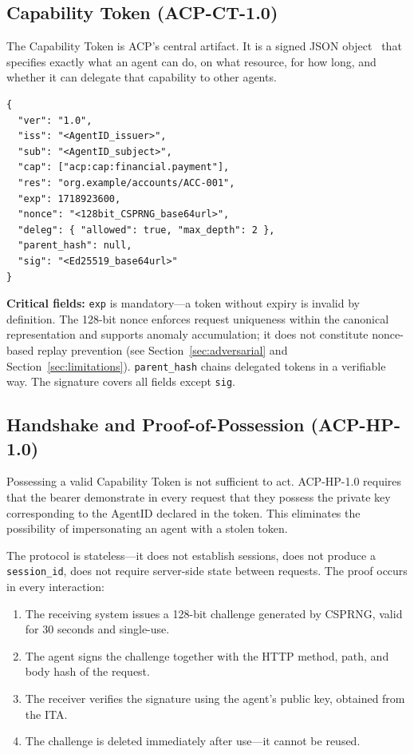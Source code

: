 \documentclass[11pt]{article}
\theoremstyle{definition}
\begin{document}
\subsection{Capability Token (ACP-CT-1.0)}

The Capability Token is ACP's central artifact.
It is a signed JSON object~\cite{rfc7519} that specifies exactly what an agent can do, on what resource, for how long, and whether it can delegate that capability to other agents.

\begin{lstlisting}[language={}]
{
  "ver": "1.0",
  "iss": "<AgentID_issuer>",
  "sub": "<AgentID_subject>",
  "cap": ["acp:cap:financial.payment"],
  "res": "org.example/accounts/ACC-001",
  "exp": 1718923600,
  "nonce": "<128bit_CSPRNG_base64url>",
  "deleg": { "allowed": true, "max_depth": 2 },
  "parent_hash": null,
  "sig": "<Ed25519_base64url>"
}
\end{lstlisting}

\textbf{Critical fields:}
\texttt{exp} is mandatory---a token without expiry is invalid by definition.
The 128-bit nonce enforces request uniqueness within the canonical representation and
supports anomaly accumulation; it does not constitute nonce-based replay prevention
(see Section~\ref{sec:adversarial} and Section~\ref{sec:limitations}).
\texttt{parent\_hash} chains delegated tokens in a verifiable way.
The signature covers all fields except \texttt{sig}.

\subsection{Handshake and Proof-of-Possession (ACP-HP-1.0)}

Possessing a valid Capability Token is not sufficient to act.
ACP-HP-1.0 requires that the bearer demonstrate in every request that they possess the private key corresponding to the AgentID declared in the token.
This eliminates the possibility of impersonating an agent with a stolen token.

The protocol is stateless---it does not establish sessions, does not produce a \texttt{session\_id}, does not require server-side state between requests. The proof occurs in every interaction:

\begin{enumerate}[noitemsep]
  \item The receiving system issues a 128-bit challenge generated by CSPRNG, valid for 30 seconds and single-use.
  \item The agent signs the challenge together with the HTTP method, path, and body hash of the request.
  \item The receiver verifies the signature using the agent's public key, obtained from the ITA.
  \item The challenge is deleted immediately after use---it cannot be reused.
\end{enumerate}
\end{document}
